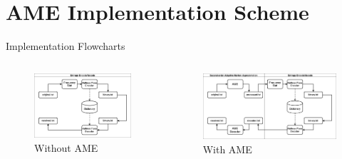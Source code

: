 \documentclass[mathserif, 13pt, aspectratio=1610]{beamer}
\begin{document}
\section{AME Implementation Scheme}
\begin{frame}{Implementation Flowcharts}
	\begin{columns}[T]
		\begin{figure}[h!]
		\centering
		\includegraphics[width=\textwidth]{without-ame.png}
		\caption{Without AME}
		\end{figure}
		\begin{figure}[h!]
		\centering
		\includegraphics[width=\textwidth]{with-ame2.png}
		\caption{With AME}
		\end{figure}
	\end{columns}
\end{frame}
\end{document}
